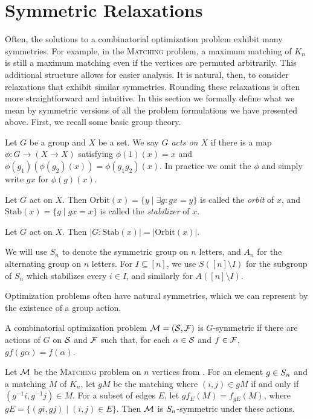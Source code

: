 \section{Symmetric Relaxations}\label{sec:symmetric-defs}
Often, the solutions to a combinatorial optimization problem exhibit many symmetries. For example, in the \textsc{Matching} problem, a maximum matching of $K_n$ is still a maximum matching even if the vertices are permuted arbitrarily. This additional structure allows for easier analysis. It is natural, then, to consider relaxations that exhibit similar symmetries. Rounding these relaxations is often more straightforward and intuitive. In this section we formally define what we mean by symmetric versions of all the problem formulations we have presented above. First, we recall some basic group theory.
\begin{definition}
Let $G$ be a group and $X$ be a set. We say \emph{$G$ acts on $X$} if there is a map $\phi: G \rightarrow (X \rightarrow X)$ satisfying $\phi(1)(x) = x$ and $\phi(g_1)(\phi(g_2)(x)) = \phi(g_1g_2)(x)$. In practice we omit the $\phi$ and simply write $gx$ for $\phi(g)(x)$.
\end{definition}
\begin{definition}
Let $G$ act on $X$. Then $\text{Orbit}(x) = \{y \mid \exists g: gx = y\}$ is called the \emph{orbit} of $x$, and $\text{Stab}(x) = \{g \mid gx = x\}$ is called the \emph{stabilizer} of $x$.
\end{definition}
\begin{fact}
Let $G$ act on $X$. Then $|G: \text{Stab}(x)| = |\text{Orbit}(x)|$.
\end{fact}
We will use $S_n$ to denote the symmetric group on $n$ letters, and $A_n$ for the alternating group on $n$ letters. For $I \subseteq [n]$, we use $S([n] \setminus I)$ for the subgroup of $S_n$ which stabilizes every $i \in I$, and similarly for $A([n]\setminus I)$.

Optimization problems often have natural symmetries, which we can represent by the existence of a group action.
\begin{definition}
A combinatorial optimization problem $\mathcal M = (\mathcal S, \mathcal F)$ is $G$-symmetric if there are actions of $G$ on $\mathcal S$ and $\mathcal F$ such that, for each $\alpha \in \mathcal S$ and $f \in \mathcal F$, $gf(g\alpha) = f(\alpha)$.
\end{definition}
\begin{example}
Let $\mathcal M$ be the \textsc{Matching} problem on $n$ vertices from . For an element $g \in S_{n}$ and a matching $M$ of $K_n$, let $gM$ be the matching where $(i,j) \in gM$ if and only if $(g^{-1}i,g^{-1}j) \in M$. For a subset of edges $E$, let $gf_E(M) = f_{gE}(M)$, where $gE = \{(gi,gj) \mid (i,j) \in E\}$. Then $\mathcal M$ is $S_{n}$-symmetric under these actions.
\end{example} 

